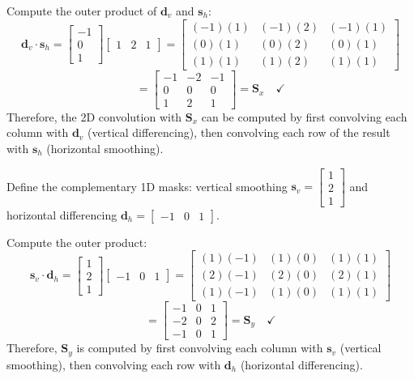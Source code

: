 \documentclass[12pt]{article}
\begin{document}
\begin{stepbox}
Compute the outer product of $\mathbf{d}_v$ and $\mathbf{s}_h$:
\[
\mathbf{d}_v \cdot \mathbf{s}_h
=
\begin{bmatrix} -1 \\ 0 \\ 1 \end{bmatrix}
\begin{bmatrix} 1 & 2 & 1 \end{bmatrix}
=
\begin{bmatrix}
(-1)(1) & (-1)(2) & (-1)(1) \\
(0)(1)  & (0)(2)  & (0)(1)  \\
(1)(1)  & (1)(2)  & (1)(1)
\end{bmatrix}
\]
\[
=
\begin{bmatrix}
-1 & -2 & -1 \\
0  & 0  & 0  \\
1  & 2  & 1
\end{bmatrix}
= \mathbf{S}_x \quad \checkmark
\]
Therefore, the 2D convolution with $\mathbf{S}_x$ can be computed by first convolving each column with $\mathbf{d}_v$ (vertical differencing), then convolving each row of the result with $\mathbf{s}_h$ (horizontal smoothing).
\end{stepbox}

\begin{stepbox}
Define the complementary 1D masks: vertical smoothing $\mathbf{s}_v = \begin{bmatrix} 1 \\ 2 \\ 1 \end{bmatrix}$ and horizontal differencing $\mathbf{d}_h = \begin{bmatrix} -1 & 0 & 1 \end{bmatrix}$.

Compute the outer product:
\[
\mathbf{s}_v \cdot \mathbf{d}_h
=
\begin{bmatrix} 1 \\ 2 \\ 1 \end{bmatrix}
\begin{bmatrix} -1 & 0 & 1 \end{bmatrix}
=
\begin{bmatrix}
(1)(-1) & (1)(0) & (1)(1) \\
(2)(-1) & (2)(0) & (2)(1) \\
(1)(-1) & (1)(0) & (1)(1)
\end{bmatrix}
\]
\[
=
\begin{bmatrix}
-1 & 0 & 1 \\
-2 & 0 & 2 \\
-1 & 0 & 1
\end{bmatrix}
= \mathbf{S}_y \quad \checkmark
\]
Therefore, $\mathbf{S}_y$ is computed by first convolving each column with $\mathbf{s}_v$ (vertical smoothing), then convolving each row with $\mathbf{d}_h$ (horizontal differencing).
\end{stepbox}
\end{document}
